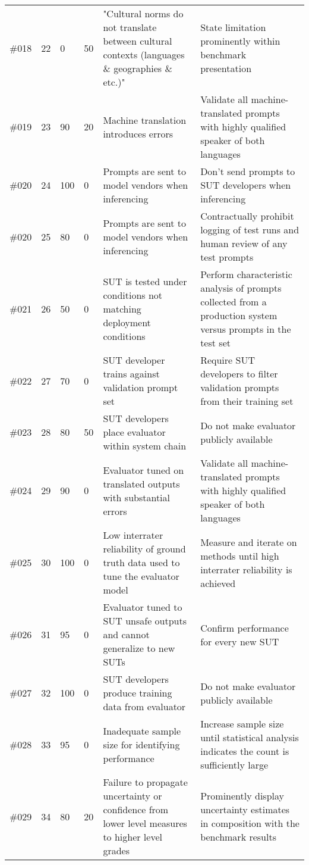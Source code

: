 \begin{longtable}{|p{1cm}|p{1cm}|p{1cm}|p{1cm}|p{4cm}|p{4cm}}
\#018 & 22 & 0 & 50 & "Cultural norms do not translate between cultural contexts (languages \&  geographies \&  etc.)" & State limitation prominently within benchmark presentation\\
\#019 & 23 & 90 & 20 & Machine translation introduces errors & Validate all machine-translated prompts with highly qualified speaker of both languages\\
\#020 & 24 & 100 & 0 & Prompts are sent to model vendors when inferencing & Don't send prompts to SUT developers when inferencing\\
\#020 & 25 & 80 & 0 & Prompts are sent to model vendors when inferencing & Contractually prohibit logging of test runs and human review of any test prompts\\
\#021 & 26 & 50 & 0 & SUT is tested under conditions not matching deployment conditions & Perform characteristic analysis of prompts collected from a production system versus prompts in the test set\\
\#022 & 27 & 70 & 0 & SUT developer trains against validation prompt set & Require SUT developers to filter validation prompts from their training set\\
\#023 & 28 & 80 & 50 & SUT developers place evaluator within system chain & Do not make evaluator publicly available\\
\#024 & 29 & 90 & 0 & Evaluator tuned on translated outputs with substantial errors & Validate all machine-translated prompts with highly qualified speaker of both languages\\
\#025 & 30 & 100 & 0 & Low interrater reliability of ground truth data used to tune the evaluator model & Measure and iterate on methods until high interrater reliability is achieved\\
\#026 & 31 & 95 & 0 & Evaluator tuned to SUT unsafe outputs and cannot generalize to new SUTs & Confirm performance for every new SUT\\
\#027 & 32 & 100 & 0 & SUT developers produce training data from evaluator & Do not make evaluator publicly available\\
\#028 & 33 & 95 & 0 & Inadequate sample size for identifying performance & Increase sample size until statistical analysis indicates the count is sufficiently large\\
\#029 & 34 & 80 & 20 & Failure to propagate uncertainty or confidence from lower level measures to higher level grades & Prominently display uncertainty estimates in composition with the benchmark results\\

\end{longtable}
